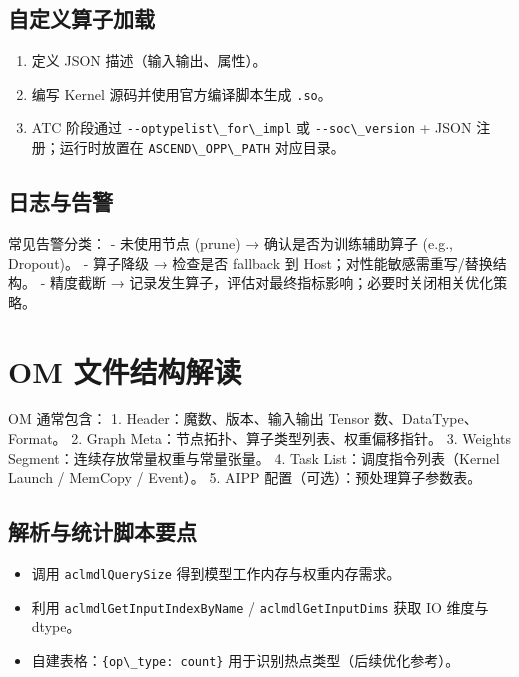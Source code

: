 \subsection{自定义算子加载}\label{ux81eaux5b9aux4e49ux7b97ux5b50ux52a0ux8f7d}

\begin{enumerate}
\def\labelenumi{\arabic{enumi}.}
\tightlist
\item
  定义 JSON 描述（输入输出、属性）。
\item
  编写 Kernel 源码并使用官方编译脚本生成 \passthrough{\lstinline!.so!}。
\item
  ATC 阶段通过 \passthrough{\lstinline!--optypelist\_for\_impl!} 或
  \passthrough{\lstinline!--soc\_version!} + JSON 注册；运行时放置在
  \passthrough{\lstinline!ASCEND\_OPP\_PATH!} 对应目录。
\end{enumerate}

\subsection{日志与告警}\label{ux65e5ux5fd7ux4e0eux544aux8b66}

常见告警分类： - 未使用节点 (prune) → 确认是否为训练辅助算子 (e.g.,
Dropout)。 - 算子降级 → 检查是否 fallback 到
Host；对性能敏感需重写/替换结构。 - 精度截断 →
记录发生算子，评估对最终指标影响；必要时关闭相关优化策略。

\section{OM 文件结构解读}\label{om-ux6587ux4ef6ux7ed3ux6784ux89e3ux8bfb}

OM 通常包含： 1. Header：魔数、版本、输入输出 Tensor
数、DataType、Format。 2. Graph
Meta：节点拓扑、算子类型列表、权重偏移指针。 3. Weights
Segment：连续存放常量权重与常量张量。 4. Task List：调度指令列表（Kernel
Launch / MemCopy / Event）。 5. AIPP 配置（可选）：预处理算子参数表。

\subsection{解析与统计脚本要点}\label{ux89e3ux6790ux4e0eux7edfux8ba1ux811aux672cux8981ux70b9}

\begin{itemize}
\tightlist
\item
  调用 \passthrough{\lstinline!aclmdlQuerySize!}
  得到模型工作内存与权重内存需求。
\item
  利用 \passthrough{\lstinline!aclmdlGetInputIndexByName!} /
  \passthrough{\lstinline!aclmdlGetInputDims!} 获取 IO 维度与 dtype。
\item
  自建表格：\passthrough{\lstinline!\{op\_type: count\}!}
  用于识别热点类型（后续优化参考）。
\end{itemize}

